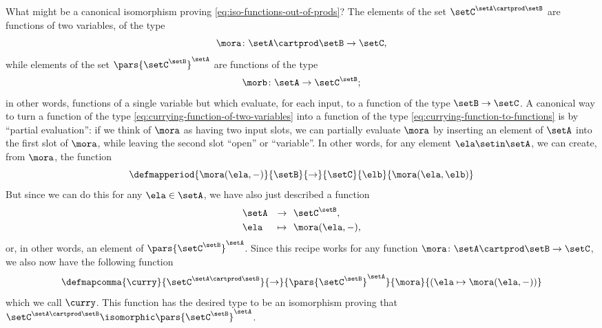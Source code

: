 What might be a canonical isomorphism proving \cref{eq:iso-functions-out-of-prods}? The elements of the set $ \setC^{\setA \cartprod \setB}$ are functions of two variables, of the type
\begin{equation}\label{eq:currying-function-of-two-variables}
    \mora \colon \setA \cartprod \setB \to \setC,
\end{equation}
while elements of the set $\pars{\setC^\setB}^\setA$ are functions of the type
\begin{equation} \label{eq:currying-function-to-functions}
    \morb \colon \setA \to \setC^\setB;
\end{equation}
in other words, functions of a single variable but which evaluate, for each input, to a function of the type $\setB \to \setC$.
A canonical way to turn a function of the type \cref{eq:currying-function-of-two-variables} into a function of the type \cref{eq:currying-function-to-functions} is by ``partial evaluation'': if we think of $\mora$ as having two input slots, we can partially evaluate $\mora$ by inserting an element of $\setA$ into the first slot of $\mora$, while leaving the second slot ``open'' or ``variable''.
In other words, for any element $\ela \setin \setA$, we can create, from $\mora$, the function
\begin{equation}
    \defmapperiod{
        \mora(\ela, -)
    }{
        \setB
    }{
        \to
    }{
        \setC
    }{
        \elb
    }{
        \mora (\ela, \elb)
    }
\end{equation}
But since we can do this for any $\ela \in \setA$, we have also just described a function
\begin{equation}
    \begin{aligned}
         & \setA & \to     & \ \ \setC^\setB, \\
         & \ela  & \mapsto & \ \  \mora ( \ela, -),
    \end{aligned}
\end{equation}
or, in other words, an element of $\pars{\setC^\setB}^\setA$. Since this recipe works for any function $\mora \colon \setA \cartprod \setB \to \setC$, we also now have the following function
\begin{equation}\label{eq:left-curry-function}
    \defmapcomma{
        \curry
    }{
        \setC^{\setA \cartprod \setB}
    }{
        \to
    }{
        \pars{\setC^\setB}^\setA
    }{
        \mora
    }{
        (\ela \mapsto \mora ( \ela, -))
    }
\end{equation}
which we call $\curry$.
This function has the desired type to be an isomorphism proving that $\setC^{\setA \cartprod \setB} \isomorphic \pars{\setC^\setB}^\setA$.

